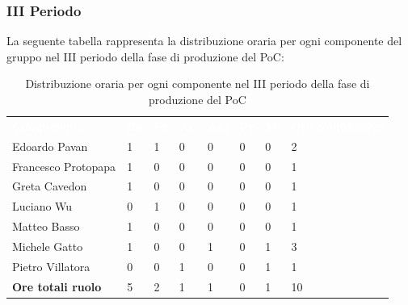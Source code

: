\subsubsection{III Periodo}
La seguente tabella rappresenta la distribuzione oraria per ogni componente del gruppo nel III periodo della fase di produzione del PoC:
\begin{table}[H]
\begin{center}
\renewcommand{\arraystretch}{1.25}
\begin{tabular}{ m{}<{\centering}  m{}<{\centering} m{}<{\centering} m{}<{\centering}  m{}<{\centering}  m{}<{\centering}  m{}<{\centering}  m{}<{\centering}   }
	\rowcolor{darkblue}
	\textcolor{white}{\textbf{Componente}} &\textcolor{white}{\textbf{Re}}&\textcolor{white}{\textbf{Pt}}&\textcolor{white}{\textbf{An}}&\textcolor{white}{\textbf{Am}}&\textcolor{white}{\textbf{Pr}}&\textcolor{white}{\textbf{Ve}}&\textcolor{white}{\textbf{Ore complessive}}\\ 
	Edoardo Pavan & 1 & 1 & 0 & 0 & 0 & 0 & 2 \\	
	
	Francesco Protopapa & 1 & 0 & 0 & 0 & 0 & 0 & 1 \\

	Greta Cavedon & 1 & 0 & 0 & 0 & 0 & 0 & 1 \\
	
	Luciano Wu & 0 & 1 & 0 & 0 & 0 & 0 & 1\\
	
	Matteo Basso & 1 & 0 & 0 & 0 & 0 & 0 & 1 \\
	
	Michele Gatto &  1 & 0 & 0 & 1 & 0 & 1 & 3\\
	
	Pietro Villatora & 0 & 0 & 1 & 0 & 0 & 1 & 1 \\
	
	\textbf{Ore totali ruolo} & 5 & 2 & 1 & 1 & 0 & 1 & 10\\

\end{tabular}
\caption{Distribuzione oraria per ogni componente nel III periodo della fase di produzione del PoC}
\end{center}
\end{table}

